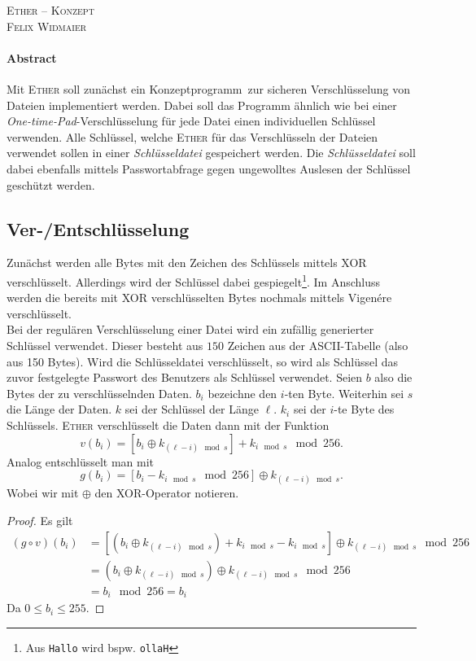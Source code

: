 \documentclass[a4paper,11pt]{article}
\begin{document}
\begin{center}
	\Huge{\textsc{Ether -- Konzept}}\\
	\normalsize\textsc{Felix Widmaier}
\end{center}
\paragraph*{Abstract}
Mit \textsc{Ether} soll zunächst ein \glqq Konzeptprogramm\grqq\ zur sicheren Verschlüsselung von Dateien implementiert werden. Dabei soll
das Programm ähnlich wie bei einer \textit{One-time-Pad}-Verschlüsselung für jede Datei einen individuellen Schlüssel verwenden. Alle Schlüssel,
welche \textsc{Ether} für das Verschlüsseln der Dateien verwendet sollen in einer \textit{Schlüsseldatei} gespeichert werden. Die
\textit{Schlüsseldatei} soll dabei ebenfalls mittels Passwortabfrage gegen ungewolltes Auslesen der Schlüssel geschützt werden.

\subsection*{Ver-/Entschlüsselung}
Zunächst werden alle Bytes mit den Zeichen des Schlüssels mittels XOR verschlüsselt. Allerdings wird der Schlüssel dabei \glqq gespiegelt\footnote{Aus \texttt{Hallo} wird
bspw. \texttt{ollaH}}\grqq. Im Anschluss werden die bereits mit XOR verschlüsselten Bytes nochmals mittels Vigen\'{e}re verschlüsselt.\\
Bei der regulären Verschlüsselung einer Datei wird ein zufällig generierter Schlüssel verwendet. Dieser besteht aus $150$ Zeichen aus der ASCII-Tabelle (also aus 150 Bytes).
Wird die Schlüsseldatei verschlüsselt, so wird als Schlüssel das zuvor festgelegte Passwort des Benutzers als Schlüssel verwendet.
Seien $b$ also die Bytes der zu verschlüsselnden Daten. $b_i$ bezeichne den $i$-ten Byte. Weiterhin sei $s$ die Länge der Daten. $k$ sei der Schlüssel der Länge $\ell$.
$k_i$ sei der $i$-te Byte des Schlüssels. \textsc{Ether} verschlüsselt die Daten dann mit der Funktion
\begin{equation}
	v(b_i) = \left[b_i\oplus k_{(\ell - i)\mod s}\right] + k_{i\mod s} \mod 256.
\end{equation}
Analog entschlüsselt man mit
\begin{equation}
	g(b_i) = \left[b_i - k_{i\mod s}\mod 256\right]\oplus k_{(\ell - i)\mod s}.
\end{equation}
Wobei wir mit $\oplus$ den XOR-Operator notieren.
\begin{proof}
	Es gilt
	\begin{align*}
		(g\circ v)(b_i) &= \left[\left(b_i\oplus k_{(\ell - i) \mod s}\right) + k_{i\mod s} - k_{i\mod s}\right]\oplus k_{(\ell - i)\mod s} \mod 256\\
		&= \left(b_i \oplus k_{(\ell - i)\mod s}\right)\oplus k_{(\ell - i)\mod s}\mod 256\\
		&= b_i\mod 256 = b_i
	\end{align*}
	Da $0\leq b_i\leq 255$.
\end{proof}
\end{document}
